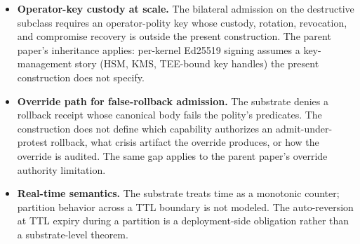 \begin{itemize}
  \item \textbf{Operator-key custody at scale.} The bilateral
    admission on the destructive subclass requires an operator-polity
    key whose custody, rotation, revocation, and compromise recovery
    is outside the present construction. The parent paper's
    inheritance applies: per-kernel Ed25519 signing assumes a key-
    management story (HSM, KMS, TEE-bound key handles) the present
    construction does not specify.
  \item \textbf{Override path for false-rollback admission.} The
    substrate denies a rollback receipt whose canonical body fails
    the polity's predicates. The construction does not define which
    capability authorizes an admit-under-protest rollback, what
    crisis artifact the override produces, or how the override is
    audited. The same gap applies to the parent paper's override
    authority limitation.
  \item \textbf{Real-time semantics.} The substrate treats time as a
    monotonic counter; partition behavior across a TTL boundary is
    not modeled. The auto-reversion at TTL expiry during a partition
    is a deployment-side obligation rather than a substrate-level
    theorem.
\end{itemize}
